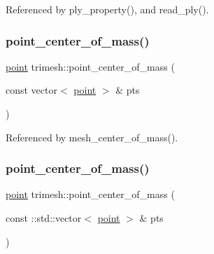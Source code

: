 Referenced by ply\+\_\+property(), and read\+\_\+ply().

\mbox{\label{namespacetrimesh_af868103eab6d05c8f416a0ffaa8a0737}} 
\subsubsection{\texorpdfstring{point\+\_\+center\+\_\+of\+\_\+mass()}{point\_center\_of\_mass()}\hspace{0.1cm}{\footnotesize\ttfamily [1/2]}}
{\footnotesize\ttfamily \hyperlink{namespacetrimesh_a325b99fd6454b22fa4c4bc3223271b2c}{point} trimesh\+::point\+\_\+center\+\_\+of\+\_\+mass (\begin{DoxyParamCaption}\item[{const vector$<$ \hyperlink{namespacetrimesh_a325b99fd6454b22fa4c4bc3223271b2c}{point} $>$ \&}]{pts }\end{DoxyParamCaption})}



Referenced by mesh\+\_\+center\+\_\+of\+\_\+mass().

\mbox{\label{namespacetrimesh_a93a754d2dc9fbf362b8ae136c7c818f0}} 
\subsubsection{\texorpdfstring{point\+\_\+center\+\_\+of\+\_\+mass()}{point\_center\_of\_mass()}\hspace{0.1cm}{\footnotesize\ttfamily [2/2]}}
{\footnotesize\ttfamily \hyperlink{namespacetrimesh_a325b99fd6454b22fa4c4bc3223271b2c}{point} trimesh\+::point\+\_\+center\+\_\+of\+\_\+mass (\begin{DoxyParamCaption}\item[{const \+::std\+::vector$<$ \hyperlink{namespacetrimesh_a325b99fd6454b22fa4c4bc3223271b2c}{point} $>$ \&}]{pts }\end{DoxyParamCaption})}

\mbox{\label{namespacetrimesh_a96ebf4e1f7c1e0006873a4cd655d3342}} 
